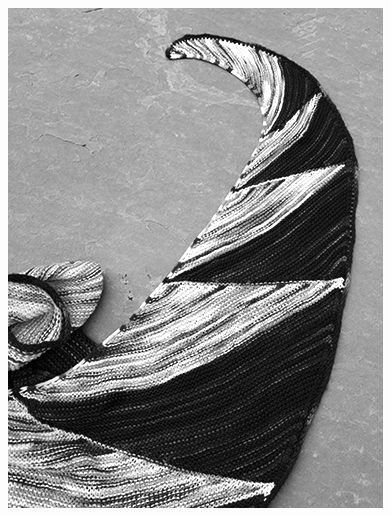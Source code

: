 \documentclass[12pt]{article}
\begin{document}
\begin{multicols}{2}
\hfill\includegraphics[width=\linewidth]{pics_BW/_COcorner}
\vfill
\end{multicols}
\end{document}
